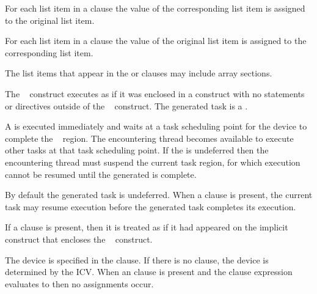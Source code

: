 For each list item in a  clause the value of the corresponding list item is assigned 
to the original list item.

For each list item in a  clause the value of the original list item is assigned to the 
corresponding list item.

The list items that appear in the  or  clauses may include array sections.

The ~ construct executes as if it was enclosed in a  construct with no statements or directives outside of the ~ construct. The generated task is a .

A  is executed immediately and waits at a task scheduling point for the device to complete the ~ region. The encountering thread becomes available to execute other tasks at that task scheduling point. If the  is undeferred then the encountering thread must suspend the current task region, for which execution cannot be resumed until the generated  is complete.

By default the generated task is undeferred. When a  clause is present, the current task may resume execution before the generated task completes its execution.

If a  clause is present, then it is treated as if it had appeared on the implicit  construct that encloses the ~ construct.

The device is specified in the  clause. If there is no  clause, the device 
is determined by the  ICV. When an  clause is present and the  
clause expression evaluates to  then no assignments occur.

